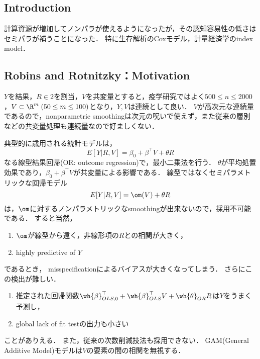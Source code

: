 \documentclass[uplatex,dvipdfmx]{jsreport}
\begin{document}
\subsection{Introduction}

計算資源が増加してノンパラが使えるようになったが，その認知容易性の低さはセミパラが補うことになった．
特に生存解析のCoxモデル，計量経済学のindex model．

\subsection{Robins and Rotnitzky：Motivation}

\begin{notation}
    $Y$を結果，$R\in2$を割当，$V$を共変量とすると，疫学研究ではよく$500\le n\le 2000$，$V\subset\R^m\;(50\le m\le 100)$となり，$Y,V$は連続として良い．
$V$が高次元な連続量であるので，nonparametric smoothingは次元の呪いで使えず，また従来の層別などの共変量処理も連続量なので好ましくない．
\end{notation}

\begin{example}
    典型的に歳用される統計モデルは，
    \[E[Y|R,V]=\beta_0+\beta^\top V+\theta R\]
    なる線型結果回帰(OR: outcome regression)で，最小二乗法を行う．
    $\theta$が平均処置効果であり，$\beta_0+\beta^\top V$が共変量による影響である．
    線型ではなくセミパラメトリックな回帰モデル
    \[E[Y|R,V]=\om(V)+\theta R\]
    は，$\om$に対するノンパラメトリックなsmoothingが出来ないので，採用不可能である．
    すると当然，
    \begin{enumerate}
        \item $\om$が線型から遠く，非線形項の$R$との相関が大きく，
        \item highly predictive of $Y$
    \end{enumerate}
    であるとき，
    misspecificationによるバイアスが大きくなってしまう．
    さらにこの検出が難しい．
    \begin{enumerate}
        \item 推定された回帰関数$\wh{\beta}_{OLS,0}^\top+\wh{\beta}_{OLS}^\top V+\wh{\theta}_{OR}R$は$Y$をうまく予測し，
        \item global lack of fit testの出力も小さい
    \end{enumerate}
    ことがありえる．
    また，従来の次数削減技法も採用できない．
    GAM(General Additive Model)モデルは$V$の要素の間の相関を無視する．
\end{example}
\end{document}
